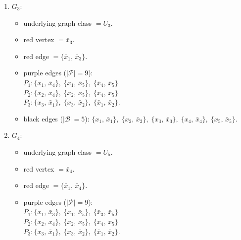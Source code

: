 \begin{enumerate}[leftmargin=*]
\begin{itemize}[leftmargin=*]
\item purple edges ($|\mathcal{P}|=9$):\mbox{}\\
$P_{1}: \{x_{2},\,x_{4}\},\; \{x_{2},\,x_{5}\},\; \{x_{4},\,x_{5}\}$\\
$P_{2}: \{x_{3},\,\bar{x}_{1}\},\; \{x_{3},\,\bar{x}_{2}\},\; \{\bar{x}_{1},\,\bar{x}_{2}\}$\\
$P_{3}: \{\bar{x}_{3},\,\bar{x}_{4}\},\; \{\bar{x}_{3},\,\bar{x}_{5}\},\; \{\bar{x}_{4},\,\bar{x}_{5}\}$.
\item black edges ($|\mathcal{B}|=5$): $\{x_{1},\,\bar{x}_{1}\},\; \{x_{2},\,\bar{x}_{2}\},\; \{x_{3},\,\bar{x}_{3}\},\; \{x_{4},\,\bar{x}_{4}\},\; \{x_{5},\,\bar{x}_{5}\}$.
\end{itemize}
\item $G_{3}$:
\begin{itemize}[leftmargin=*]
\item underlying graph class $= U_3$.
\item red vertex $= \bar{x}_{3}$.
\item red edge $= \{\bar{x}_{1},\,\bar{x}_{3}\}$.
\item purple edges ($|\mathcal{P}|=9$):\mbox{}\\
$P_{1}: \{x_{1},\,\bar{x}_{4}\},\; \{x_{1},\,\bar{x}_{5}\},\; \{\bar{x}_{4},\,\bar{x}_{5}\}$\\
$P_{2}: \{x_{2},\,x_{4}\},\; \{x_{2},\,x_{5}\},\; \{x_{4},\,x_{5}\}$\\
$P_{3}: \{x_{3},\,\bar{x}_{1}\},\; \{x_{3},\,\bar{x}_{2}\},\; \{\bar{x}_{1},\,\bar{x}_{2}\}$.
\item black edges ($|\mathcal{B}|=5$): $\{x_{1},\,\bar{x}_{1}\},\; \{x_{2},\,\bar{x}_{2}\},\; \{x_{3},\,\bar{x}_{3}\},\; \{x_{4},\,\bar{x}_{4}\},\; \{x_{5},\,\bar{x}_{5}\}$.
\end{itemize}
\item $G_{4}$:
\begin{itemize}[leftmargin=*]
\item underlying graph class $= U_5$.
\item red vertex $= \bar{x}_{4}$.
\item red edge $= \{\bar{x}_{1},\,\bar{x}_{4}\}$.
\item purple edges ($|\mathcal{P}|=9$):\mbox{}\\
$P_{1}: \{x_{1},\,\bar{x}_{3}\},\; \{x_{1},\,\bar{x}_{5}\},\; \{\bar{x}_{3},\,\bar{x}_{5}\}$\\
$P_{2}: \{x_{2},\,x_{4}\},\; \{x_{2},\,x_{5}\},\; \{x_{4},\,x_{5}\}$\\
$P_{3}: \{x_{3},\,\bar{x}_{1}\},\; \{x_{3},\,\bar{x}_{2}\},\; \{\bar{x}_{1},\,\bar{x}_{2}\}$.

\end{itemize}
\end{enumerate}
